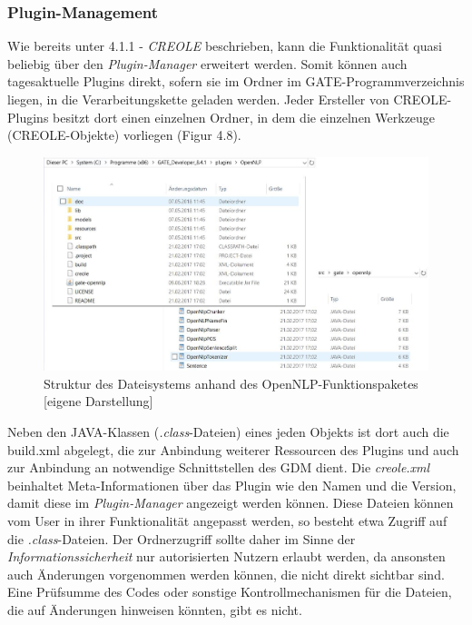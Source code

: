 \documentclass[12pt]{report}
\begin{document}
\subsubsection{Plugin-Management}
Wie bereits unter 4.1.1 - \textit{CREOLE} beschrieben, kann die Funktionalität quasi beliebig über den \textit{Plugin-Manager} erweitert werden. Somit können auch tagesaktuelle Plugins direkt, sofern sie im Ordner im GATE-Programmverzeichnis liegen, in die Verarbeitungskette geladen werden. Jeder Ersteller von CREOLE-Plugins besitzt dort einen einzelnen Ordner, in dem die einzelnen Werkzeuge (CREOLE-Objekte) vorliegen (Figur 4.8). 
 
\begin{figure}[h!]
\begin{center}
\includegraphics[scale=0.55]{GATE_Bilder/PluginOrdner.jpg}
\caption{Struktur des Dateisystems anhand des OpenNLP-Funktionspaketes [eigene Darstellung]}
\end{center}
\end{figure} 

Neben den JAVA-Klassen (\textit{.class}-Dateien) eines jeden Objekts ist dort auch die build.xml abgelegt, die zur Anbindung weiterer Ressourcen des Plugins und auch zur Anbindung an notwendige Schnittstellen des GDM dient. Die \textit{creole.xml} beinhaltet Meta-Informationen über das Plugin wie den Namen und die Version, damit diese im \textit{Plugin-Manager} angezeigt werden können. Diese Dateien können vom User in ihrer Funktionalität angepasst werden, so besteht etwa Zugriff auf die \textit{.class}-Dateien. Der Ordnerzugriff sollte daher im Sinne der \textit{Informationssicherheit} nur autorisierten Nutzern erlaubt werden, da ansonsten auch Änderungen vorgenommen werden können, die nicht direkt sichtbar sind. Eine Prüfsumme des Codes oder sonstige Kontrollmechanismen für die Dateien, die auf Änderungen hinweisen könnten, gibt es nicht.\\
\end{document}
